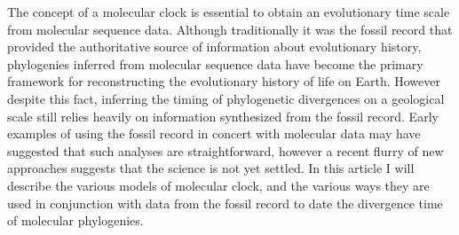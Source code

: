 The concept of a molecular clock is essential to obtain an evolutionary time scale from molecular sequence data.
Although traditionally it was the fossil record that provided the authoritative source of information about evolutionary history, phylogenies inferred from molecular sequence data have become the primary framework for reconstructing the evolutionary history of life on Earth. However despite this fact, inferring the timing of phylogenetic divergences on a geological scale still relies heavily on information synthesized from the fossil record. Early examples of using the fossil record in concert with molecular data may have suggested that such analyses are straightforward, however a recent flurry of new approaches suggests that the science is not yet settled. In this article I will describe the various models of molecular clock, and the various ways they are used in conjunction with data from the fossil record to date the divergence time of molecular phylogenies.
  